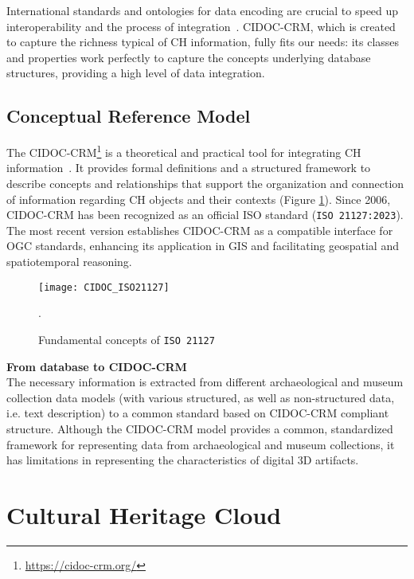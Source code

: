 International standards and ontologies for data encoding are crucial
to speed up interoperability and the process of integration~\cite{eide2008encoding}. \gls{CIDOC-CRM}, which is created to capture the richness typical of CH
information, fully fits our needs: its classes and properties
work perfectly to capture the concepts underlying database structures, providing a high level of data integration.



\subsection{ Conceptual Reference Model} 
\label{sec:cidoc}


The \gls{CIDOC-CRM}\footnote{\url{https://cidoc-crm.org/}} is a theoretical and practical tool for integrating \gls{CH} information~\cite{eide2008encoding}. It provides formal definitions and a structured framework to describe concepts and relationships that support the organization and connection of information regarding \gls{CH} objects and their contexts (Figure \ref{fig:cidoc}).
Since 2006, \gls{CIDOC-CRM} has been recognized as an official ISO standard (\texttt{ISO 21127:2023}). The most recent version establishes \gls{CIDOC-CRM} as a compatible interface for \gls{OGC} standards, enhancing its application in \gls{GIS} and facilitating geospatial and spatiotemporal reasoning.


\begin{figure}[h!]
    \centering
    \texttt{[image: CIDOC\_ISO21127]}
    \caption{Fundamental concepts of \texttt{ISO 21127}~\cite{doerr2007cidoc}}.
    \label{fig:cidoc}
\end{figure}
\FloatBarrier

\newpage

\noindent \textbf{From database to \gls{CIDOC-CRM}} \\
The necessary information is extracted from different archaeological and museum collection data models (with various structured, as well as non-structured
data, i.e. text description) to a common standard based on \gls{CIDOC-CRM} compliant structure.
Although the \gls{CIDOC-CRM} model provides a common, standardized framework for representing data from archaeological and museum collections, it has limitations in representing the characteristics of digital \gls{3D} artifacts.



\section{Cultural Heritage Cloud}
\label{sec:ch_cloud}

